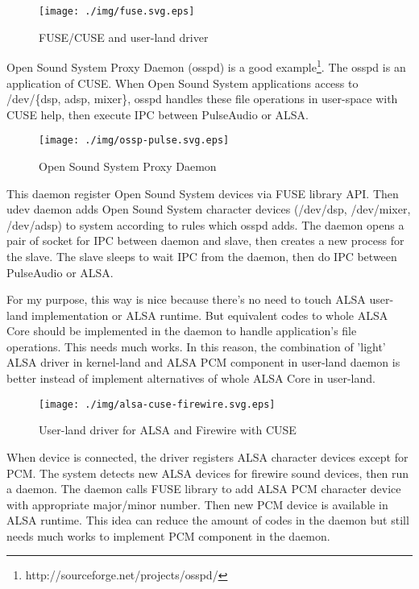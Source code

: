 \documentclass[onecolumn]{article}
\begin{document}
\begin{figure}[H]
	\centering
	\texttt{[image: ./img/fuse.svg.eps]}
	\caption{{FUSE/CUSE and user-land driver}}
	\label{fuse}
\end{figure}

Open Sound System Proxy Daemon (osspd) is a good example\footnote{http://sourceforge.net/projects/osspd/}. The osspd is an application of CUSE. When Open Sound System applications access to /dev/\{dsp, adsp, mixer\}, osspd handles these file operations in user-space with CUSE help, then execute IPC between PulseAudio or ALSA.

\begin{figure}[H]
	\centering
	\texttt{[image: ./img/ossp-pulse.svg.eps]}
	\caption{{Open Sound System Proxy Daemon}}
	\label{osspd_pulse}
\end{figure}


This daemon register Open Sound System devices via FUSE library API. Then udev daemon adds Open Sound System character devices (/dev/dsp, /dev/mixer, /dev/adsp) to system according to rules which osspd adds. The daemon opens a pair of socket for IPC between daemon and slave, then creates a new process for the slave. The slave sleeps to wait IPC from the daemon, then do IPC between PulseAudio or ALSA.

For my purpose, this way is nice because there's no need to touch ALSA user-land implementation or ALSA runtime. But equivalent codes to whole ALSA Core should be implemented in the daemon to handle application's file operations. This needs much works. In this reason, the combination of 'light' ALSA driver in kernel-land and ALSA PCM component in user-land daemon is better instead of implement alternatives of whole ALSA Core in user-land.

\begin{figure}[H]
	\centering
	\texttt{[image: ./img/alsa-cuse-firewire.svg.eps]}
	\caption{{User-land driver for ALSA and Firewire with CUSE}}
	\label{alsa_cuse_firewire}
\end{figure}

When device is connected, the driver registers ALSA character devices except for PCM. The system detects new ALSA devices for firewire sound devices, then run a daemon. The daemon calls FUSE library to add ALSA PCM character device with appropriate major/minor number. Then new PCM device is available in ALSA runtime. This idea can reduce the amount of codes in the daemon but still needs much works to implement PCM component in the daemon.
\end{document}
